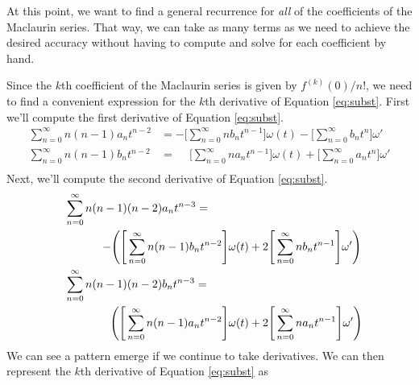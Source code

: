 \documentclass{report}
\begin{document}
At this point, we want to find a general recurrence for \emph{all} of the
coefficients of the Maclaurin series. That way, we can take as many
terms as we need to achieve the desired accuracy without having to
compute and solve for each coefficient by hand.

Since the $k$th coefficient of the Maclaurin series is given by $f^{(k)}(0)/n!$, we need to find a convenient expression for the $k$th derivative of
Equation \ref{eq:subst}.
First we'll compute the first derivative of Equation \ref{eq:subst}.
\begin{equation} \label{eq:diff1}
    \begin{aligned}
    \sum_{n=0}^\infty n(n-1)a_n t^{n-2} &=
        -\Bigg[\sum_{n=0}^\infty nb_n t^{n-1} \Bigg]
            \omega(t)
                - \Bigg[\sum_{n=0}^\infty b_n t^n \Bigg]
                \omega'\\
    \sum_{n=0}^\infty n(n-1)b_n t^{n-2} &=
        \phantom{-}\Bigg[\sum_{n=0}^\infty na_n t^{n-1} \Bigg]
            \omega(t)
                + \Bigg[\sum_{n=0}^\infty a_n t^n \Bigg]
                \omega'\\
    \end{aligned}
\end{equation}
Next, we'll compute the second derivative of Equation \ref{eq:subst}.
\begin{equation} \label{eq:diff2}
    \begin{gathered}
    \shoveleft{\sum_{n=0}^\infty n(n-1)(n-2)a_n t^{n-3} =}\\
        \qquad\qquad-\Bigg(\Bigg[\sum_{n=0}^\infty n(n-1)b_n t^{n-2} \Bigg]
             \omega(t)
                + 2\Bigg[\sum_{n=0}^\infty n b_n t^{n-1} \Bigg]
                \omega'\Bigg)\\
    \shoveleft{\sum_{n=0}^\infty n(n-1)(n-2)b_n t^{n-3} =}\\
        \qquad\qquad\phantom{-}\Bigg(\Bigg[\sum_{n=0}^\infty n(n-1)a_n t^{n-2} \Bigg]
            \omega(t)
                + 2\Bigg[\sum_{n=0}^\infty n a_n t^{n-1} \Bigg]
                \omega'\Bigg)\\
    \end{gathered}
\end{equation}
We can see a pattern emerge if we continue to take derivatives.
We can then represent the $k$th derivative of Equation \ref{eq:subst} as
\end{document}

